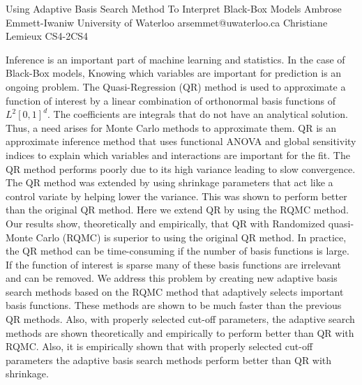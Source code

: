 \begin{talk}
  {Using Adaptive Basis Search Method To Interpret Black-Box Models}%
  {Ambrose Emmett-Iwaniw}%
  {University of Waterloo}%
  {arsemmet@uwaterloo.ca}%
  {Christiane Lemieux}%
{}{}{CS4-2}{CS4}

			
Inference is an important part of machine learning and statistics. In the case of Black-Box models, Knowing which variables are important for prediction is an ongoing problem. The Quasi-Regression (QR) method is used to approximate a function of interest by a linear combination of orthonormal basis functions of $L^2[0,1]^{d}$. The coefficients are integrals that do not have an analytical solution. Thus, a need arises for Monte Carlo methods to approximate them. QR is an approximate inference method that uses functional ANOVA and global sensitivity indices to explain which variables and interactions are important for the fit. The QR method performs poorly due to its high variance leading to slow convergence. The QR method was extended by using shrinkage parameters that act like a control variate by helping lower the variance. This was shown to perform better than the original QR method. Here we extend QR by using the RQMC method. Our results show, theoretically and empirically, that QR with Randomized quasi-Monte Carlo (RQMC) is superior to using the original QR method. In practice, the QR method can be time-consuming if the number of basis functions is large. If the function of interest is sparse many of these basis functions are irrelevant and can be removed. We address this problem by creating new adaptive basis search methods based on the RQMC method that adaptively selects important basis functions. These methods are shown to be much faster than the previous QR methods. Also, with properly selected cut-off parameters, the adaptive search methods are shown theoretically and empirically to perform better than QR with RQMC. Also, it is empirically shown that with properly selected cut-off parameters the adaptive basis search methods perform better than QR with shrinkage.
\end{talk}

